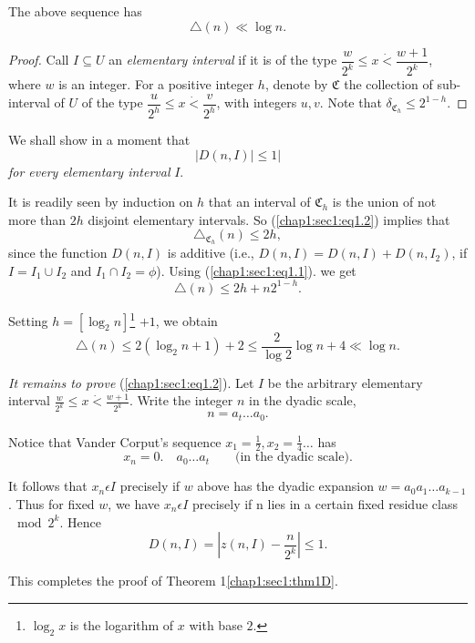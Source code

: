 \begin{theorem}\label{chap1:sec1:thm1D}
\cite{29} The above sequence has
$$
 \triangle(n) \ll \log n. 
$$
\end{theorem}

\begin{proof}
  Call $I \subseteq U$ an {\em elementary interval} if it is of the type $\dfrac{w}{2^{k}} \leq x \dot{<} \dfrac{w + 1}{2^{k}}$, where $w$ is an integer. For a positive integer $h$, denote by $\mathfrak{C}$ the collection of sub-interval of $U$ of the type $\dfrac{u}{2^{h}} \leq x \dot{<} \dfrac{v}{2^{h}}$, with integers $u, v$. Note that $\delta_{\mathfrak{C}_{h}} \leq 2^{1-h}$.
\end{proof}

We shall show in a moment that
\begin{equation*}
 |D(n, I)|\leq 1|\tag{1.2}\label{chap1:sec1:eq1.2}
\end{equation*}
{\em for every elementary interval} $I$.\pageoriginale

It is readily seen by induction on $h$ that an interval of $\mathfrak{C}_{h}$ is the union of not more than $2h$ disjoint elementary intervals. So (\ref{chap1:sec1:eq1.2}) implies that
$$
\triangle_{\mathfrak{C}_{h}}(n) \leq 2h ,
$$
since the function $D(n, I)$ is additive (i.e., $D(n, I) = D(n, I)+ D(n, I_{2})$, if $I = I_{1} \cup I_{2}$ and $I_{1} \cap I_{2} = \phi$). Using (\ref{chap1:sec1:eq1.1}). we get
$$
\triangle(n) \leq 2h + n 2^{1-h}.
$$

Setting $h = [\log_{2} n]$\footnote{$\log_{2} x$ is the logarithm of $x$ with base  $2$.}
$+ 1$, we obtain
$$
 \triangle(n) \leq 2(\log_{2} n+1) + 2 \leq \frac{2}{\log 2} \log n + 4 \ll \log n.
$$

{\em It remains to prove} (\ref{chap1:sec1:eq1.2}). Let $I$ be the arbitrary elementary interval $\frac{w}{2^{k}} \leq x \dot{<} \frac{w+1}{2^{k}}$. Write the integer $n$ in the dyadic scale,
$$
n = a_{t} \ldots a_{0}.
$$

Notice that Vander Corput's sequence $x_{1} = \frac{1}{2}, x_{2} = \frac{1}{4} \ldots$ has 
$$
x_{n} = 0. \quad a_{0} \ldots a_{t}\qquad\text{(in the dyadic scale).}
$$

It follows that $x_{n} \epsilon I$ precisely if $w$ above has the dyadic expansion $w = a_{0}a_{1} \ldots a_{k - 1}$. Thus for fixed $w$, we have $x_{n} \epsilon I$ precisely if n lies in a certain fixed residue class $\mod 2^{k}$. Hence
$$
D(n, I) = |z(n, I) - \frac{n}{2^{k}}| \leq 1 .
$$

This completes the proof of Theorem 1\ref{chap1:sec1:thm1D}.

